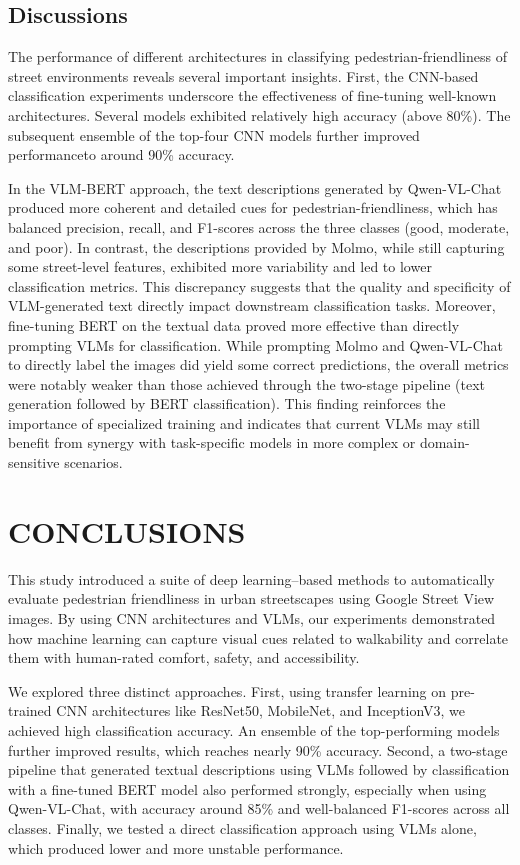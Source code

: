 \documentclass[11pt]{article}
\begin{document}
\subsection{Discussions}
The performance of different architectures in classifying pedestrian-friendliness of street environments reveals several important insights. First, the CNN-based classification experiments underscore the effectiveness of fine-tuning well-known architectures. Several models exhibited relatively high accuracy (above 80\%). The subsequent ensemble of the top-four CNN models further improved performanceto around 90\% accuracy. 

In the VLM-BERT approach, the text descriptions generated by Qwen-VL-Chat produced more coherent and detailed cues for pedestrian-friendliness, which has balanced precision, recall, and F1-scores across the three classes (good, moderate, and poor). In contrast, the descriptions provided by Molmo, while still capturing some street-level features, exhibited more variability and led to lower classification metrics. This discrepancy suggests that the quality and specificity of VLM-generated text directly impact downstream classification tasks. Moreover, fine-tuning BERT on the textual data proved more effective than directly prompting VLMs for classification. While prompting Molmo and Qwen-VL-Chat to directly label the images did yield some correct predictions, the overall metrics were notably weaker than those achieved through the two-stage pipeline (text generation followed by BERT classification). This finding reinforces the importance of specialized training and indicates that current VLMs may still benefit from synergy with task-specific models in more complex or domain-sensitive scenarios.

\section{CONCLUSIONS}
This study introduced a suite of deep learning–based methods to automatically evaluate pedestrian friendliness in urban streetscapes using Google Street View images. By using CNN architectures and VLMs, our experiments demonstrated how machine learning can capture visual cues related to walkability and correlate them with human-rated comfort, safety, and accessibility.

We explored three distinct approaches. First, using transfer learning on pre-trained CNN architectures like ResNet50, MobileNet, and InceptionV3, we achieved high classification accuracy. An ensemble of the top-performing models further improved results, which reaches nearly 90\% accuracy. Second, a two-stage pipeline that generated textual descriptions using VLMs followed by classification with a fine-tuned BERT model also performed strongly, especially when using Qwen-VL-Chat, with accuracy around 85\% and well-balanced F1-scores across all classes. Finally, we tested a direct classification approach using VLMs alone, which produced lower and more unstable performance. 
\end{document}
